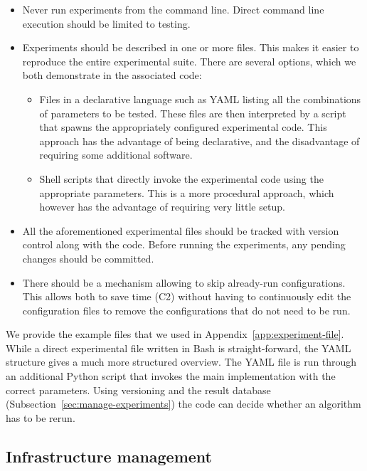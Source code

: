 \documentclass{llncs}
\begin{document}
\begin{itemize}
\item Never run experiments from the command line. Direct command line execution
  should be limited to testing.
\item Experiments should be described in one or more files. This makes it easier
  to reproduce the entire experimental suite. There are several options, which we both 
  demonstrate in the associated code:
  \begin{itemize}
    \item Files in a declarative language such as YAML listing all the combinations of
    parameters to be tested. These files are then interpreted by a script that spawns
    the appropriately configured experimental code. This approach has the advantage of
    being declarative, and the disadvantage of requiring some additional software.
    \item Shell scripts that directly invoke the experimental code using 
      the appropriate parameters. This is a more procedural approach, which however has
      the advantage of requiring very little setup.
  \end{itemize}
\item All the aforementioned experimental files should be tracked with version 
  control along with the code. Before running the experiments, any pending changes should be committed.
\item There should be a mechanism allowing to skip already-run configurations.
  This allows both to save time (C2) without having to continuously edit
  the configuration files to remove the configurations that do not need to be run.
\end{itemize}
%
We provide the example files that we used in Appendix~\ref{app:experiment-file}. While a direct experimental file written in Bash is straight-forward, the YAML structure gives a much more structured overview. The YAML file is run through an additional Python script that invokes the main implementation with the correct parameters. Using versioning and the result database (Subsection~\ref{sec:manage-experiments}) the code can decide whether an algorithm has to be rerun.

\subsection{Infrastructure management}
\end{document}
